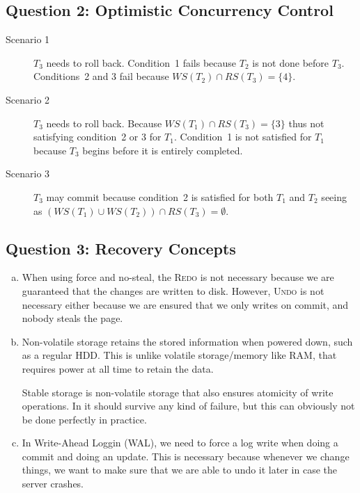 \documentclass[a4paper]{article}
\begin{document}
\subsection{Question 2: Optimistic Concurrency Control}

\begin{description}
    \item[Scenario 1] $T_3$ needs to roll back. Condition~1 fails because $T_2$
        is not done before $T_3$. Conditions~2 and 3 fail because $WS(T_2) \cap
        RS(T_3) = \{4\}$.
    \item[Scenario 2] $T_3$ needs to roll back. Because $WS(T_1) \cap RS(T_3) =
        \{3\}$ thus not satisfying condition~2 or 3 for $T_1$. Condition~1 is
        not satisfied for $T_1$ because $T_3$ begins before it is entirely
        completed.
    \item[Scenario 3] $T_3$ may commit because condition~2 is satisfied for
        both $T_1$ and $T_2$ seeing as $(WS(T_1) \cup WS(T_2)) \cap RS(T_3) =
        \emptyset$.
\end{description}

\subsection{Question 3: Recovery Concepts}

\begin{enumerate}[(a)]
    \item When using force and no-steal, the \textsc{Redo} is not necessary
        because we are guaranteed that the changes are written to disk.
        However, \textsc{Undo} is not necessary either because we are ensured
        that we only writes on commit, and nobody steals the page.
    \item Non-volatile storage retains the stored information when powered
        down, such as a regular HDD\@. This is unlike volatile storage/memory
        like RAM, that requires power at all time to retain the data.

        Stable storage is non-volatile storage that also ensures atomicity of
        write operations. In it should survive any kind of failure, but this
        can obviously not be done perfectly in practice.
    \item In Write-Ahead Loggin (WAL), we need to force a log write when doing
        a commit and doing an update. This is necessary because whenever we
        change things, we want to make sure that we are able to undo it later
        in case the server crashes.
\end{enumerate}
\end{document}
